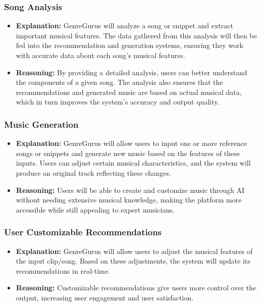 \documentclass{article}
\begin{document}
\subsubsection*{Song Analysis}
\begin{itemize}
    \item \textbf{Explanation:} GenreGurus will analyze a song or snippet and extract important musical features. The data gathered from this analysis will then be fed into the recommendation and generation systems, ensuring they work with accurate data about each song's musical features.
    \item \textbf{Reasoning:} By providing a detailed analysis, users can better understand the components of a given song. The analysis also ensures that the recommendations and generated music are based on actual musical data, which in turn improves the system’s accuracy and output quality.
\end{itemize}

\subsubsection*{Music Generation}
\begin{itemize}
    \item \textbf{Explanation:} GenreGurus will allow users to input one or more reference songs or snippets and generate new music based on the features of these inputs. Users can adjust certain musical characteristics, and the system will produce an original track reflecting these changes.
    \item \textbf{Reasoning:} Users will be able to create and customize music through AI without needing extensive musical knowledge, making the platform more accessible while still appealing to expert musicians.
\end{itemize}

\subsubsection*{User Customizable Recommendations}
\begin{itemize}
    \item \textbf{Explanation:} GenreGurus will allow users to adjust the musical features of the input clip/song. Based on these adjustments, the system will update its recommendations in real-time.
    \item \textbf{Reasoning:} Customizable recommendations give users more control over the output, increasing user engagement and user satisfaction.
\end{itemize}
\end{document}
